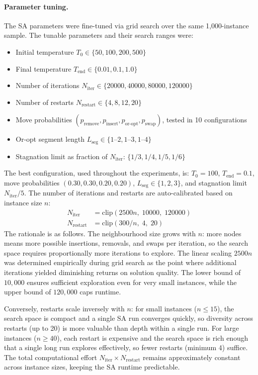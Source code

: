 \documentclass[11pt,a4paper]{article}
\begin{document}
\paragraph{Parameter tuning.}
The SA parameters were fine-tuned via grid search over the same 1{,}000-instance sample.
The tunable parameters and their search ranges were:
\begin{itemize}[nosep]
  \item Initial temperature $T_0 \in \{50, 100, 200, 500\}$
  \item Final temperature $T_{\text{end}} \in \{0.01, 0.1, 1.0\}$
  \item Number of iterations $N_{\text{iter}} \in \{20000, 40000, 80000, 120000\}$
  \item Number of restarts $N_{\text{restart}} \in \{4, 8, 12, 20\}$
  \item Move probabilities $(p_{\text{remove}}, p_{\text{insert}}, p_{\text{or-opt}}, p_{\text{swap}})$, tested in 10 configurations
  \item Or-opt segment length $L_{\text{seg}} \in \{1\text{--}2, 1\text{--}3, 1\text{--}4\}$
  \item Stagnation limit as fraction of $N_{\text{iter}}$: $\{1/3, 1/4, 1/5, 1/6\}$
\end{itemize}

The best configuration, used throughout the experiments, is: $T_0 = 100$, $T_{\text{end}} = 0.1$, move probabilities $(0.30, 0.30, 0.20, 0.20)$, $L_{\text{seg}} \in \{1,2,3\}$, and stagnation limit $N_{\text{iter}}/5$.
The number of iterations and restarts are auto-calibrated based on instance size $n$:
\begin{align}
  N_{\text{iter}} &= \text{clip}(2500n,\; 10000,\; 120000) \\
  N_{\text{restart}} &= \text{clip}(300/n,\; 4,\; 20)
\end{align}
The rationale is as follows.
The neighbourhood size grows with $n$: more nodes means more possible insertions, removals, and swaps per iteration, so the search space requires proportionally more iterations to explore.
The linear scaling $2500n$ was determined empirically during grid search as the point where additional iterations yielded diminishing returns on solution quality.
The lower bound of $10{,}000$ ensures sufficient exploration even for very small instances, while the upper bound of $120{,}000$ caps runtime.

Conversely, restarts scale inversely with $n$: for small instances ($n \leq 15$), the search space is compact and a single SA run converges quickly, so diversity across restarts (up to 20) is more valuable than depth within a single run.
For large instances ($n \geq 40$), each restart is expensive and the search space is rich enough that a single long run explores effectively, so fewer restarts (minimum 4) suffice.
The total computational effort $N_{\text{iter}} \times N_{\text{restart}}$ remains approximately constant across instance sizes, keeping the SA runtime predictable.
\end{document}
